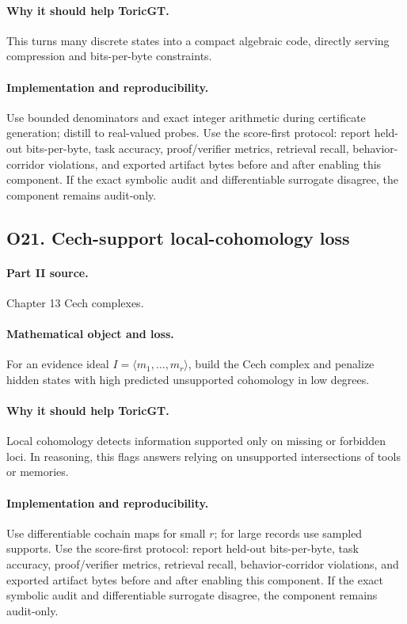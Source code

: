 \documentclass[11pt]{article}
\theoremstyle{definition}
\begin{document}
\paragraph{Why it should help ToricGT.} This turns many discrete states into a compact algebraic code, directly serving compression and bits-per-byte constraints.
\paragraph{Implementation and reproducibility.} Use bounded denominators and exact integer arithmetic during certificate generation; distill to real-valued probes.  Use the score-first protocol: report held-out bits-per-byte, task accuracy, proof/verifier metrics, retrieval recall, behavior-corridor violations, and exported artifact bytes before and after enabling this component.  If the exact symbolic audit and differentiable surrogate disagree, the component remains audit-only.


\subsection{O21. Cech-support local-cohomology loss}
\paragraph{Part II source.} Chapter 13 Cech complexes.
\paragraph{Mathematical object and loss.} For an evidence ideal $I=\langle m_1,\ldots,m_r\rangle$, build the Cech complex and penalize hidden states with high predicted unsupported cohomology in low degrees.
\paragraph{Why it should help ToricGT.} Local cohomology detects information supported only on missing or forbidden loci.  In reasoning, this flags answers relying on unsupported intersections of tools or memories.
\paragraph{Implementation and reproducibility.} Use differentiable cochain maps for small $r$; for large records use sampled supports.  Use the score-first protocol: report held-out bits-per-byte, task accuracy, proof/verifier metrics, retrieval recall, behavior-corridor violations, and exported artifact bytes before and after enabling this component.  If the exact symbolic audit and differentiable surrogate disagree, the component remains audit-only.
\end{document}
